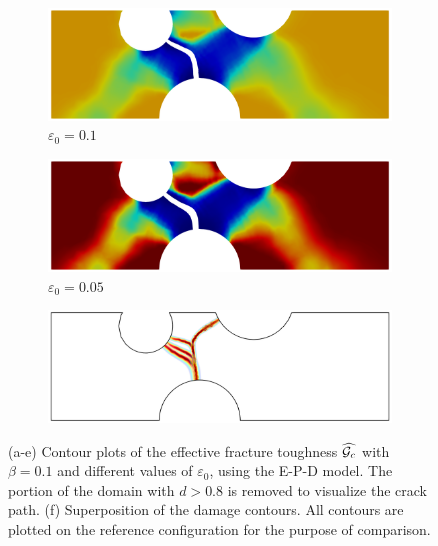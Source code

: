 \begin{figure}[!htb]
  \begin{subfigure}[b]{0.3\textwidth}
    \centering
    \includegraphics[width=\textwidth,scale=0.5]{Chapter5/figures/3pb/beta_0.1_e0_0.1}
    \caption{$\varepsilon_0=0.1$}
  \end{subfigure}
  \begin{subfigure}[b]{0.3\textwidth}
    \centering
    \includegraphics[width=\textwidth,scale=0.5]{Chapter5/figures/3pb/beta_0.1_e0_0.05}
    \caption{$\varepsilon_0=0.05$}
  \end{subfigure}
  \begin{subfigure}[b]{0.3\textwidth}
    \centering
    \includegraphics[width=\textwidth,scale=0.5]{Chapter5/figures/3pb/compare_beta_constant}
    \caption{}
  \end{subfigure}
  \caption{(a-e) Contour plots of the effective fracture toughness $\widehat{{\mathcal{G}_c}}$ with $\beta=0.1$ and different values of $\varepsilon_0$, using the E-P-D model. The portion of the domain with $d > 0.8$ is removed to visualize the crack path. (f) Superposition of the damage contours. All contours are plotted on the reference configuration for the purpose of comparison.}
  \label{fig: Chapter5/3pb/2D_comparison_constant_beta}
\end{figure}
